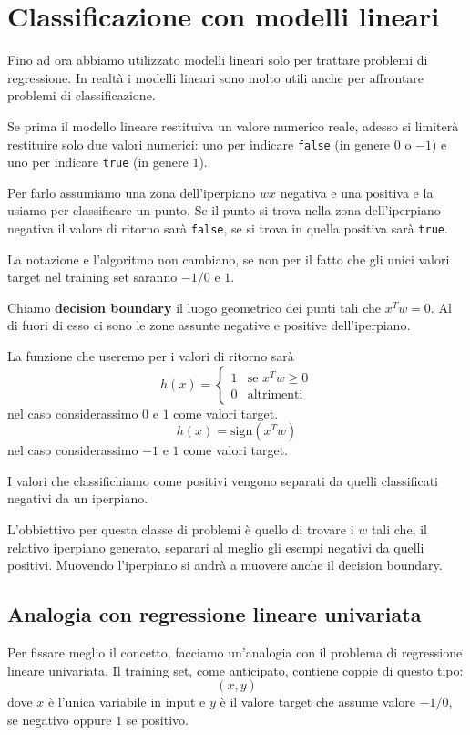 \chapter{Classificazione con modelli lineari}
Fino ad ora abbiamo utilizzato modelli lineari solo per trattare problemi di regressione. In realt\`a i modelli lineari
sono molto utili anche per affrontare problemi di classificazione.

Se prima il modello lineare restituiva un valore numerico reale, adesso si limiter\`a restituire solo due valori numerici:
uno per indicare \verb|false| (in genere $0$ o $-1$) e uno per indicare \verb|true| (in genere $1$).

Per farlo assumiamo una zona dell'iperpiano $wx$ negativa e una positiva e la usiamo per classificare un punto. Se il
punto si trova nella zona dell'iperpiano negativa il valore di ritorno sar\`a \verb|false|, se si trova in quella
positiva sar\`a \verb|true|.

La notazione e l'algoritmo non cambiano, se non per il fatto che gli unici valori target nel training set saranno $-1/0$
e $1$.

\begin{definition}
	Chiamo \textbf{decision boundary} il luogo geometrico dei punti tali che $x^T w = 0$. Al di fuori di esso ci sono
	le zone assunte negative e positive dell'iperpiano.
\end{definition}

La funzione che useremo per i valori di ritorno sar\`a
\[
	h(x) = \begin{cases}
		1 & \text{se } x^T w \geq 0 \\
		0 & \text{altrimenti}
	\end{cases}
\]
nel caso considerassimo $0$ e $1$ come valori target.
\[ h(x) = \text{sign}(x^T w) \]
nel caso considerassimo $-1$ e $1$ come valori target.

I valori che classifichiamo come positivi vengono separati da quelli classificati negativi da un iperpiano.

L'obbiettivo per questa classe di problemi \`e quello di trovare i $w$ tali che, il relativo iperpiano generato,
separari al meglio gli esempi negativi da quelli positivi. Muovendo l'iperpiano si andr\`a a muovere anche il decision
boundary.

\section{Analogia con regressione lineare univariata}
Per fissare meglio il concetto, facciamo un'analogia con il problema di regressione lineare univariata. Il training
set, come anticipato, contiene coppie di questo tipo:
\[ (x, y) \]
dove $x$ \`e l'unica variabile in input e $y$ \`e il valore target che assume valore $-1/0$, se negativo oppure $1$ se
positivo.

